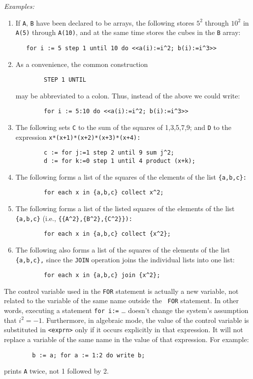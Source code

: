 {\it Examples:}
\begin{enumerate}
\item If {\tt A}, {\tt B} have been declared to be arrays, the following
stores $5^{2}$ through $10^{2}$ in {\tt A(5)} through {\tt A(10)}, and at
the same time stores the cubes in the {\tt B} array:
\begin{verbatim}
   for i := 5 step 1 until 10 do <<a(i):=i^2; b(i):=i^3>>
\end{verbatim}
\item As a convenience, the common construction
\begin{verbatim}
        STEP 1 UNTIL
\end{verbatim}
may be abbreviated to a colon. Thus, instead of the above we could write:
\begin{verbatim}
        for i := 5:10 do <<a(i):=i^2; b(i):=i^3>>
\end{verbatim}
\item The following sets {\tt C} to the sum of the squares of 1,3,5,7,9;
and {\tt D} to the expression {\tt x*(x+1)*(x+2)*(x+3)*(x+4):}
\begin{verbatim}
        c := for j:=1 step 2 until 9 sum j^2;
        d := for k:=0 step 1 until 4 product (x+k);
\end{verbatim}
\item The following forms a list of the squares of the elements of the list
{\tt \{a,b,c\}:}
\begin{verbatim}
        for each x in {a,b,c} collect x^2;
\end{verbatim}
\item The following forms a list of the listed squares of the elements of the
list {\tt \{a,b,c\}}
(i.e., {\tt \{\{A\verb|^|2\},\{B\verb|^|2\},\{C\verb|^|2\}\}):}
\begin{verbatim}
        for each x in {a,b,c} collect {x^2};
\end{verbatim}
\item The following also forms a list of the squares of the elements of
the list {\tt \{a,b,c\},} since the {\tt JOIN} operation joins the
individual lists into one list:
\begin{verbatim}
        for each x in {a,b,c} join {x^2};
\end{verbatim}
\end{enumerate}
The control variable used in the {\tt FOR} statement is actually a new
variable, not related to the variable of the same name outside the {\tt
FOR} statement.  In other words, executing a statement {\tt for i:=} \ldots
doesn't change the system's assumption that $i^{2} = -1$.
Furthermore, in algebraic mode, the value of the control variable is
substituted in {\tt <exprn>} only if it occurs explicitly in that
expression.  It will not replace a variable of the same name in the value
of that expression.  For example:
\begin{verbatim}
        b := a; for a := 1:2 do write b;
\end{verbatim}
prints {\tt A} twice, not 1 followed by 2.

